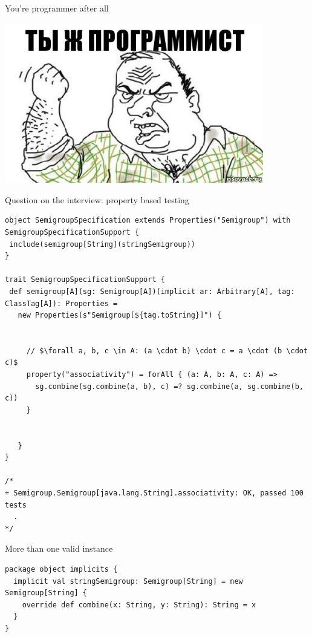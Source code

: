 \documentclass[presentation,aspectratio=169,smaller]{beamer}
\begin{document}
\begin{frame}[label={sec:org97394aa}]{You're programmer after all}
\begin{center}
\includegraphics[height=7cm]{images/you-re-programmer.jpg}
\end{center}
\end{frame}

\begin{frame}[label={sec:org197d12f},fragile]{Question on the interview: property based testing}
 \begin{verbatim}
object SemigroupSpecification extends Properties("Semigroup") with SemigroupSpecificationSupport {
 include(semigroup[String](stringSemigroup))
}

trait SemigroupSpecificationSupport {
 def semigroup[A](sg: Semigroup[A])(implicit ar: Arbitrary[A], tag: ClassTag[A]): Properties =
   new Properties(s"Semigroup[${tag.toString}]") {


     // $\forall a, b, c \in A: (a \cdot b) \cdot c = a \cdot (b \cdot c)$
     property("associativity") = forAll { (a: A, b: A, c: A) =>
       sg.combine(sg.combine(a, b), c) =? sg.combine(a, sg.combine(b, c))
     }


   }
}

/*
+ Semigroup.Semigroup[java.lang.String].associativity: OK, passed 100 tests
  .
*/
\end{verbatim}
\end{frame}

\begin{frame}[label={sec:org60a81ad},fragile]{More than one valid instance}
 \begin{verbatim}
package object implicits {
  implicit val stringSemigroup: Semigroup[String] = new Semigroup[String] {
    override def combine(x: String, y: String): String = x
  }
}
\end{verbatim}
\end{frame}
\end{document}
